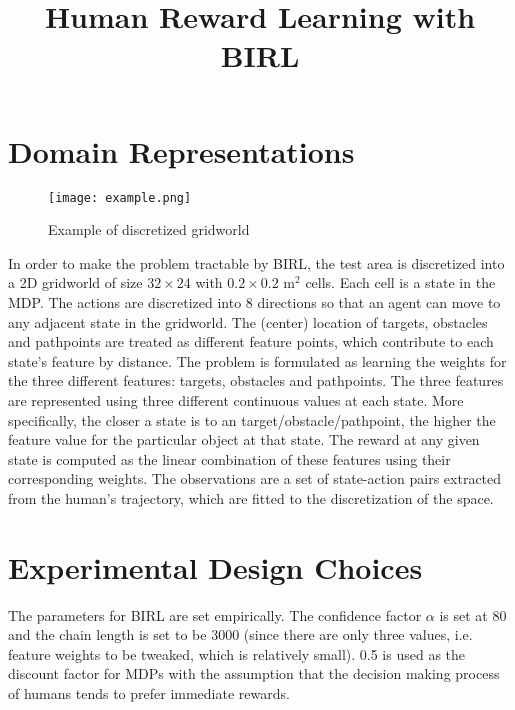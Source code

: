 \documentclass[12pt]{article}
\title{\LARGE \bf  Human Reward Learning with BIRL }
\begin{document}
\thispagestyle{fancy}
    \maketitle
    \pagestyle{fancy}

\section{Domain Representations}

\begin{figure}[h!]
    \centering
    \texttt{[image: example.png]}
    \caption{Example of discretized gridworld}
    \label{gridworld}
\end{figure}

In order to make the problem tractable by BIRL, the test area is discretized into a 2D gridworld of size $32\times 24$ with $0.2 \times 0.2$ $\text{m}^2$ cells. Each cell is a state in the MDP. The actions are discretized into 8 directions so that an agent can move to any adjacent state in the gridworld. The (center) location of targets, obstacles and pathpoints are treated as different feature points, which contribute to each state's feature by distance. The problem is formulated as learning the weights for the three different features: targets, obstacles and pathpoints. The three features are represented using three different continuous values at each state. More specifically, the closer a state is to an target/obstacle/pathpoint, the higher the feature value for the particular object at that state. The reward at any given state is computed as the linear combination of these features using their corresponding weights. The observations are a set of state-action pairs extracted from the human's trajectory, which are fitted to the discretization of the space. \par

\section{Experimental Design Choices}

The parameters for BIRL are set empirically. The confidence factor $\alpha$ is set at 80 and the chain length is set to be 3000 (since there are only three values, i.e. feature weights to be tweaked, which is relatively small). 0.5 is used as the discount factor for MDPs with the assumption that the decision making process of humans tends to prefer immediate rewards. \par
\end{document}
